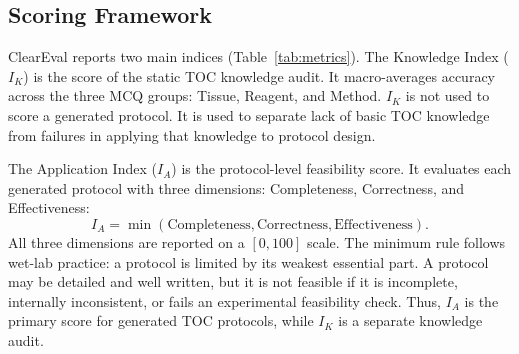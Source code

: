 \documentclass[conference]{IEEEtran}
\begin{document}
\subsection{Scoring Framework}

ClearEval reports two main indices (Table~\ref{tab:metrics}). The Knowledge
Index ($I_K$) is the score of the static TOC knowledge audit. It macro-averages
accuracy across the three MCQ groups: Tissue, Reagent, and Method. $I_K$ is not
used to score a generated protocol. It is used to separate lack of basic TOC
knowledge from failures in applying that knowledge to protocol design.

The Application Index ($I_A$) is the protocol-level feasibility score. It
evaluates each generated protocol with three dimensions: Completeness,
Correctness, and Effectiveness:
\begin{equation}
I_A = \min(\text{Completeness}, \text{Correctness}, \text{Effectiveness}).
\end{equation}
All three dimensions are reported on a $[0,100]$ scale. The minimum rule follows
wet-lab practice: a protocol is limited by its weakest essential part. A
protocol may be detailed and well written, but it is not feasible if it is
incomplete, internally inconsistent, or fails an experimental feasibility check.
Thus, $I_A$ is the primary score for generated TOC protocols, while $I_K$ is a
separate knowledge audit.
\end{document}
